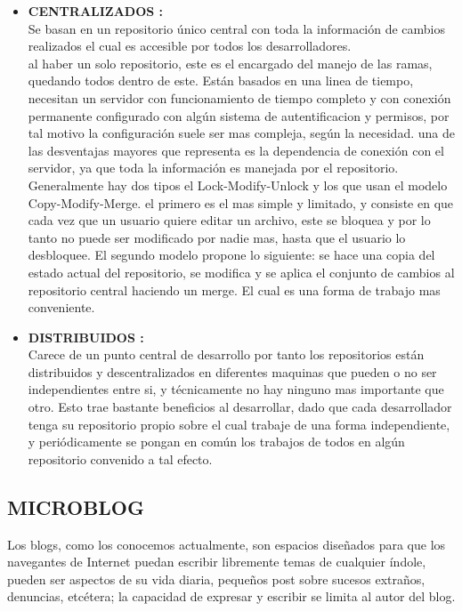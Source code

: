 \begin{itemize}
\item \textbf{CENTRALIZADOS :}\\Se basan en un repositorio único central con toda la información de cambios realizados el cual es accesible por todos los desarrolladores.\\
al haber un solo repositorio, este es el encargado del manejo de las ramas, quedando todos dentro de este. Están basados en una linea de tiempo, necesitan un servidor con funcionamiento de tiempo completo y con conexión permanente
configurado con algún sistema de autentificacion y permisos, por tal motivo la configuración suele ser mas compleja, según la necesidad. 
una de las desventajas mayores que representa es la dependencia de conexión con el servidor, ya que toda la información es manejada por el repositorio. 
Generalmente hay dos tipos el Lock-Modify-Unlock y los que usan el modelo Copy-Modify-Merge. el primero es el mas simple y limitado, y consiste en que cada vez que un usuario quiere editar un archivo, este se bloquea y por lo tanto no puede ser
modificado por nadie mas, hasta que el usuario lo desbloquee. El segundo modelo propone lo siguiente: se hace una copia del estado actual del repositorio, se modifica y se aplica el conjunto de cambios al repositorio central haciendo un merge. El cual es una forma de trabajo mas conveniente.
\item \textbf{DISTRIBUIDOS :}\\Carece de un punto central de desarrollo por tanto los repositorios están distribuidos y descentralizados en diferentes maquinas que pueden o no ser independientes entre si, y 
técnicamente no hay ninguno mas importante que otro. Esto trae bastante beneficios al desarrollar, dado que cada desarrollador tenga su repositorio propio sobre el cual trabaje de una forma independiente, y periódicamente se pongan en común los trabajos de todos en algún repositorio convenido a tal efecto.

\end{itemize}

\subsection{MICROBLOG}

Los blogs, como los conocemos actualmente, son espacios diseñados para que los navegantes de Internet puedan escribir libremente temas de cualquier índole, pueden ser aspectos de su vida diaria, pequeños post sobre sucesos extraños, denuncias, etcétera; la capacidad de expresar y escribir se limita al autor del blog.

